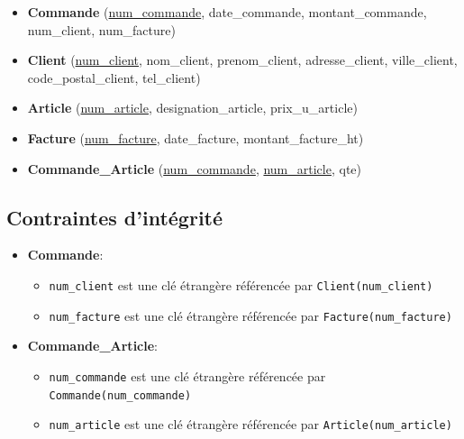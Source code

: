 \documentclass[a4paper,11pt]{article}
\begin{document}
\begin{itemize}
    \item \textbf{Commande} (\underline{num\_commande}, date\_commande, montant\_commande, num\_client, num\_facture)
    \item \textbf{Client} (\underline{num\_client}, nom\_client, prenom\_client, adresse\_client, ville\_client, code\_postal\_client, tel\_client)
    \item \textbf{Article} (\underline{num\_article}, designation\_article, prix\_u\_article)
    \item \textbf{Facture} (\underline{num\_facture}, date\_facture, montant\_facture\_ht)
    \item \textbf{Commande\_Article} (\underline{num\_commande}, \underline{num\_article}, qte)
\end{itemize}

\subsection*{Contraintes d'intégrité}
\begin{itemize}
    \item \textbf{Commande}:
    \begin{itemize}
        \item \texttt{num\_client} est une clé étrangère référencée par \texttt{Client(num\_client)}
        \item \texttt{num\_facture} est une clé étrangère référencée par \texttt{Facture(num\_facture)}
    \end{itemize}
    \item \textbf{Commande\_Article}:
    \begin{itemize}
        \item \texttt{num\_commande} est une clé étrangère référencée par \texttt{Commande(num\_commande)}
        \item \texttt{num\_article} est une clé étrangère référencée par \texttt{Article(num\_article)}
    \end{itemize}
\end{itemize}
\end{document}
